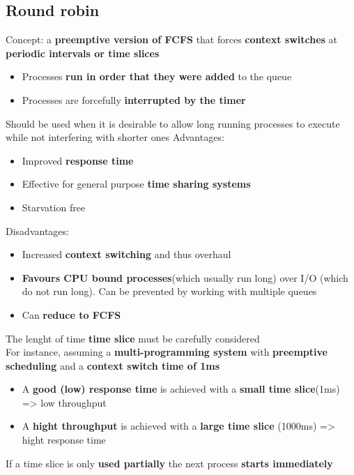 \documentclass{article}
\begin{document}
\subsection{Round robin}
\begin{flushleft}
Concept: a \textbf{preemptive version of FCFS} that forces \textbf{context switches} at \textbf{periodic intervals or time slices}
\begin{itemize}
	\item Processes \textbf{run in order that they were added} to the queue
	\item Processes are forcefully \textbf{interrupted by the timer}
\end{itemize}
Should be used when it is desirable to allow long running processes to execute while not interfering with shorter ones
Advantages:
\begin{itemize}
	\item Improved \textbf{response time}
	\item Effective for general purpose \textbf{time sharing systems}
	\item Starvation free
\end{itemize}
Disadvantages:
\begin{itemize}
	\item Increased \textbf{context switching} and thus overhaul
	\item \textbf{Favours CPU bound processes}(which usually run long) over I/O (which do not run long). Can be prevented by working with multiple queues
	\item Can \textbf{reduce to FCFS}
\end{itemize}
The lenght of time \textbf{time slice} must be carefully considered\\
For instance, assuming a \textbf{multi-programming system} with \textbf{preemptive scheduling} and a \textbf{context switch time of 1ms}\\
\begin{itemize}
	\item A \textbf{good (low) response time} is achieved with a \textbf{small time slice}(1ms) => low throughput
	\item A \textbf{hight throughput} is achieved with a \textbf{large time slice} (1000ms) => hight response time
\end{itemize}
If a time slice is only \textbf{used partially} the next process \textbf{starts immediately}
\end{flushleft}
\end{document}

